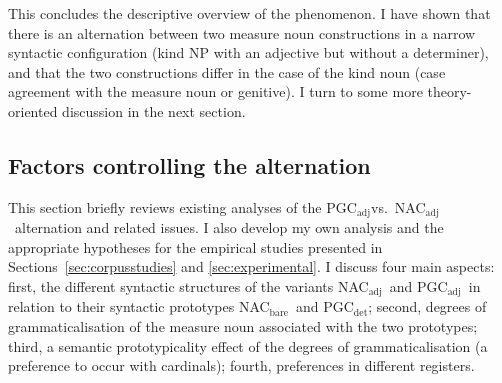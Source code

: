 \documentclass[USenglish]{article}
\newcommand{\Sub}[1]{\ensuremath{\mathrm{_{#1}}}}
\newcommand{\NACb}{NAC\Sub{bare}}
\newcommand{\NACa}{NAC\Sub{adj}}
\newcommand{\PGCd}{PGC\Sub{det}}
\newcommand{\PGCa}{PGC\Sub{adj}}
\begin{document}
This concludes the descriptive overview of the phenomenon.
I have shown that there is an alternation between two measure noun constructions in a narrow syntactic configuration (kind NP with an adjective but without a determiner), and that the two constructions differ in the case of the kind noun (case agreement with the measure noun or genitive).
I turn to some more theory-oriented discussion in the next section.



\subsection{Factors controlling the alternation}
\label{sec:analyses}

This section briefly reviews existing analyses of the \PGCa vs.\ \NACa\ alternation and related issues.
I also develop my own analysis and the appropriate hypotheses for the empirical studies presented in Sections~\ref{sec:corpusstudies} and \ref{sec:experimental}.
I discuss four main aspects:
first, the different syntactic structures of the variants \NACa\ and \PGCa\ in relation to their syntactic prototypes \NACb\ and \PGCd;
second, degrees of grammaticalisation of the measure noun associated with the two prototypes;
third, a semantic prototypicality effect of the degrees of grammaticalisation (a preference to occur with cardinals);
fourth, preferences in different registers.

\end{document}

